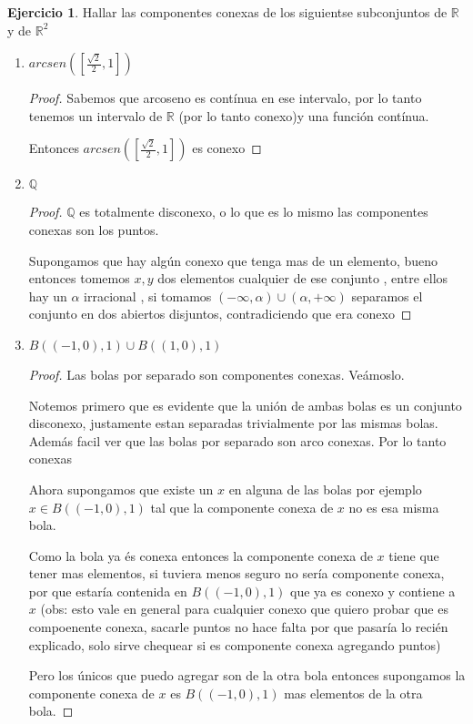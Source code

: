 \documentclass[11pt]{report}
\newcommand{\Q}{\mathbb{Q}}
\newcommand{\R}{\mathbb{R}}
\theoremstyle{definition}
\newtheorem{ej}{Ejercicio}
\begin{document}
\begin{ej}
	Hallar las componentes conexas de los siguientse subconjuntos de $\R$ y de $\R^2$
	\begin{enumerate}
		\item $arcsen([\frac{\sqrt{2}}{2},1])$
			\begin{proof}
				Sabemos que arcoseno es contínua en ese intervalo, por lo tanto tenemos un intervalo de $\R$ (por lo tanto conexo)y una función contínua. 

				Entonces $arcsen([\frac{\sqrt{2}}{2},1])$ es conexo
			\end{proof}
		\item $\Q$
			\begin{proof}
				$\Q$ es totalmente disconexo, o lo que es lo mismo las componentes conexas son los puntos.

				Supongamos que hay algún conexo que tenga mas de un elemento, bueno entonces tomemos $x,y$ dos elementos cualquier de ese conjunto , entre ellos hay un $\alpha$ irracional , si tomamos $(-\infty, \alpha) \cup (\alpha,+\infty)$ separamos el conjunto en dos abiertos disjuntos, contradiciendo que era conexo
			\end{proof}
		\item $B((-1,0),1) \cup B( (1,0),1)$
			\begin{proof}
				Las bolas por separado son componentes conexas. Veámoslo.

				Notemos primero que es evidente que la unión de ambas bolas es un conjunto disconexo, justamente estan separadas trivialmente por las mismas bolas. Además facil ver que las bolas por separado son arco conexas. Por lo tanto conexas

				Ahora supongamos que existe un $x$ en alguna de las bolas por ejemplo $x \in B( (-1,0),1)$ tal que la componente conexa de $x$ no es esa misma bola.

				Como la bola ya és conexa entonces la componente conexa de $x$ tiene que tener mas elementos, si tuviera menos seguro no sería componente conexa, por que estaría contenida en $B( (-1,0),1)$ que ya es conexo y contiene a $x$ (obs: esto vale en general para cualquier conexo que quiero probar que es compoenente conexa, sacarle puntos no hace falta por que pasaría lo recién explicado, solo sirve chequear si es componente conexa agregando puntos)

				Pero los únicos que puedo agregar son de la otra bola entonces supongamos la componente conexa de $x$ es $B( (-1,0),1)$ mas elementos de la otra bola.


\end{proof}
\end{enumerate}
\end{ej}
\end{document}
